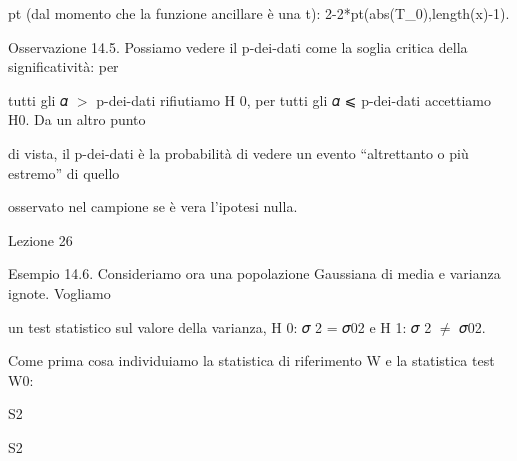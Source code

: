 \documentclass[a4paper,portrait,12pt]{article}
\begin{document}
\begin{flushleft}
pt (dal momento che la funzione ancillare \`{e} una t): 2-2*pt(abs(T\_0),length(x)-1).
\end{flushleft}


\begin{flushleft}
Osservazione 14.5. Possiamo vedere il p-dei-dati come la soglia critica della significativit\`{a}: per
\end{flushleft}


\begin{flushleft}
tutti gli 𝛼 $>$ p-dei-dati rifiutiamo H 0, per tutti gli 𝛼 ⩽ p-dei-dati accettiamo H0. Da un altro punto
\end{flushleft}


\begin{flushleft}
di vista, il p-dei-dati \`{e} la probabilit\`{a} di vedere un evento {``}altrettanto o più estremo'' di quello
\end{flushleft}


\begin{flushleft}
osservato nel campione se \`{e} vera l'ipotesi nulla.
\end{flushleft}


\begin{flushleft}
Lezione 26
\end{flushleft}





\begin{flushleft}
Esempio 14.6. Consideriamo ora una popolazione Gaussiana di media e varianza ignote. Vogliamo
\end{flushleft}


\begin{flushleft}
un test statistico sul valore della varianza, H 0: 𝜎 2 = 𝜎02 e H 1: 𝜎 2 $\neq$ 𝜎02.
\end{flushleft}


\begin{flushleft}
Come prima cosa individuiamo la statistica di riferimento W e la statistica test W0:
\end{flushleft}





\begin{flushleft}
S2
\end{flushleft}


\begin{flushleft}
S2
\end{flushleft}
\end{document}
